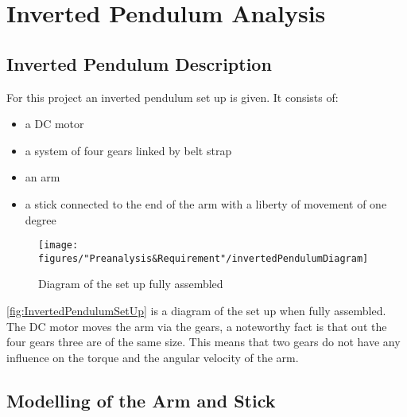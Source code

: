 \chapter{Inverted Pendulum Analysis}


\section{Inverted Pendulum Description}
For this project an inverted pendulum set up is given. It consists of:
\begin{itemize}
	\item a DC motor
	\item a system of four gears linked by belt strap
	\item an arm
	\item a stick connected to the end of the arm with a liberty of movement of one degree
\end{itemize}

\begin{figure} [htbp]
	\centering
	\texttt{[image: figures/"Preanalysis\&Requirement"/invertedPendulumDiagram]}
	\caption{Diagram of the set up fully assembled} \label{fig:InvertedPendulumSetUp}
\end{figure}

\autoref{fig:InvertedPendulumSetUp} is a diagram of the set up when fully assembled. The DC motor moves the arm via the gears, a noteworthy fact is that out the four gears three are of the same size. This means that two gears do not have any influence on the torque and the angular velocity of the arm.

\section{Modelling of the Arm and Stick}\label{sec:StickArm}


